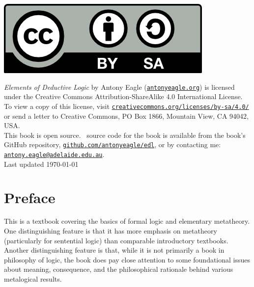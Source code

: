 \documentclass[openany,leqno,10pt]{book}
\theoremstyle{break}
\theoremstyle{definition}
\theoremstyle{remark}
\begin{document}
\thispagestyle{empty}
\vspace{2cm}
\begin{center}
    
	\includegraphics{by-sa.png} \vspace{1cm}



{\small    	\emph{Elements of Deductive Logic} by Antony Eagle (\href{http://antonyeagle.org}{\nolinkurl{antonyeagle.org}}) is	licensed under the Creative Commons Attribution-ShareAlike 4.0 International License.\\[1cm]

To view a copy of this license, visit \href{http://creativecommons.org/licenses/by-sa/4.0/}{\nolinkurl{creativecommons.org/licenses/by-sa/4.0/}} or send a letter to Creative Commons, PO Box 1866, Mountain View, CA 94042, USA.\\[1cm]

This book is open source. \XeLaTeX\ source code for the book is available from the book's GitHub repository, \href{https://github.com/antonyeagle/edl}{\nolinkurl{github.com/antonyeagle/edl}}, or by contacting me: \href{mailto:antony.eagle@adelaide.edu.au}{\nolinkurl{antony.eagle@adelaide.edu.au}}.\\[4cm]

    Last updated  \today\\[1cm]
    


}

\end{center}


\pagestyle{fancy}

\chapter*{Preface}

This is a textbook covering the basics of formal logic and elementary metatheory. One distinguishing feature is that it has more emphasis on metatheory (particularly for sentential logic) than comparable introductory textbooks. Another distinguishing feature is that, while it is not primarily a book in philosophy of logic, the book does pay close attention to some foundational issues about meaning, consequence, and the philosophical rationale behind various metalogical results.
\end{document}
